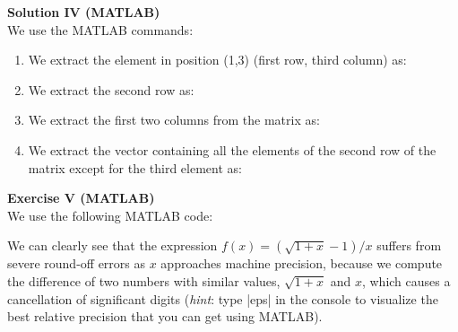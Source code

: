 \documentclass[11pt]{article}
\begin{document}
\bigskip

{\bf{Solution IV (MATLAB)}}\\

We use the MATLAB commands:
\begin{enumerate}
\item We extract the element in position (1,3) (first row, third column) as:
\item We extract the second row as:
\item We extract the first two columns from the matrix as:
\item We extract the vector containing all the elements of the second row of the matrix except for the third element as:
\end{enumerate}

\bigskip

{\bf{Exercise V (MATLAB)}}\\
We use the following MATLAB code:

We can clearly see that the expression $f(x) = (\sqrt{1+x}-1)/x$ suffers from severe round-off errors as $x$ approaches machine precision, because we compute the difference of two numbers with similar values, $\sqrt{1+x}$ and $x$, which causes a cancellation of significant digits (\textit{hint}: type |eps| in the console to visualize the best relative precision that you can get using MATLAB).
\end{document}
